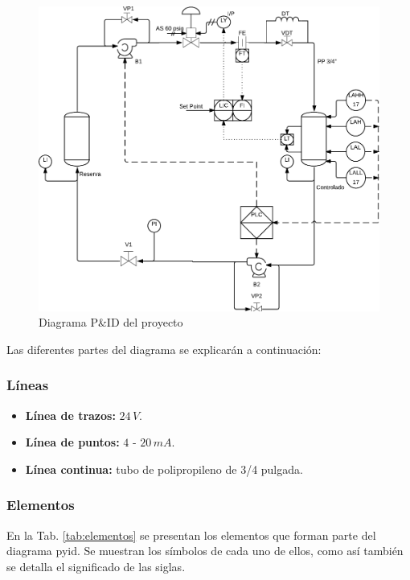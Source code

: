 \begin{figure}
	\centering
\includegraphics[width=\textwidth]{Cap2-DisenoEnsamblado/images/p&id.pdf}
	\caption{Diagrama P\&ID del proyecto}
	\label{img:pyid}
\end{figure}

Las diferentes partes del diagrama se explicarán a continuación:

\subsubsection{Líneas}

\begin{itemize}
 \item \textbf{Línea de trazos:} $24\,V$.
 \item \textbf{Línea de puntos:} $4$ - $20\,mA$.
 \item \textbf{Línea continua:} tubo de polipropileno de 3/4 pulgada.
\end{itemize}

\subsubsection{Elementos}

En la Tab. \ref{tab:elementos} se presentan los elementos
que forman parte del diagrama \gls{pyid}. Se muestran
los símbolos de cada uno de ellos, como así
también se detalla el significado de las siglas.

